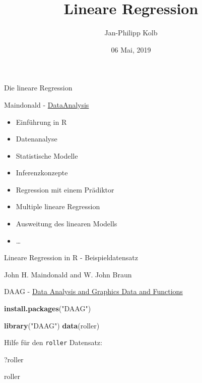 \documentclass[
  ignorenonframetext,
]{beamer}
\title{Lineare Regression}
\author{Jan-Philipp Kolb}
\date{06 Mai, 2019}
\newenvironment{Shaded}{\begin{snugshade}}{\end{snugshade}}
\newcommand{\KeywordTok}[1]{\textcolor[rgb]{0.26,0.66,0.93}{\textbf{#1}}}
\newcommand{\NormalTok}[1]{\textcolor[rgb]{0.74,0.68,0.62}{#1}}
\newcommand{\StringTok}[1]{\textcolor[rgb]{0.02,0.61,0.04}{#1}}
\providecommand{\tightlist}{%
  \setlength{\itemsep}{0pt}\setlength{\parskip}{0pt}}
\begin{document}
\frame{\titlepage}

\begin{frame}{Die lineare Regression}
\protect\hypertarget{die-lineare-regression}{}

Maindonald -
\href{https://cran.r-project.org/doc/contrib/usingR.pdf}{DataAnalysis}

\begin{itemize}
\tightlist
\item
  Einführung in R
\item
  Datenanalyse
\item
  Statistische Modelle
\item
  Inferenzkonzepte
\item
  Regression mit einem Prädiktor
\item
  Multiple lineare Regression
\item
  Ausweitung des linearen Modells
\item
  \ldots{}
\end{itemize}

\end{frame}

\begin{frame}[fragile]{Lineare Regression in R - Beispieldatensatz}
\protect\hypertarget{lineare-regression-in-r---beispieldatensatz}{}

John H. Maindonald and W. John Braun

DAAG -
\href{http://cran.ms.unimelb.edu.au/web/packages/DAAG/DAAG.pdf}{Data
Analysis and Graphics Data and Functions}

\begin{Shaded}
\begin{Highlighting}[]
\KeywordTok{install.packages}\NormalTok{(}\StringTok{"DAAG"}\NormalTok{)}
\end{Highlighting}
\end{Shaded}

\begin{Shaded}
\begin{Highlighting}[]
\KeywordTok{library}\NormalTok{(}\StringTok{"DAAG"}\NormalTok{)}
\KeywordTok{data}\NormalTok{(roller)}
\end{Highlighting}
\end{Shaded}

Hilfe für den \texttt{roller} Datensatz:

\begin{Shaded}
\begin{Highlighting}[]
\NormalTok{?roller}
\end{Highlighting}
\end{Shaded}

\begin{Shaded}
\begin{Highlighting}[]
\NormalTok{roller}
\end{Highlighting}
\end{Shaded}

\end{frame}
\end{document}
